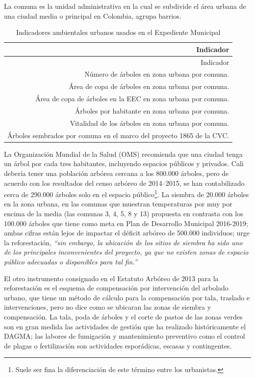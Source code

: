 \documentclass[12pt,]{book}
\let\rmarkdownfootnote\footnote%
\def\footnote{\protect\rmarkdownfootnote}
\begin{document}
La comuna es la unidad administrativa en la cual se subdivide el área
urbana de una ciudad media o principal en Colombia, agrupa barrios.

\begin{longtable}[]{@{}r@{}}
\caption{\label{tab:indic-ExMu} Indicadores ambientales urbanos usados en el
Expediente Municipal}\tabularnewline
\toprule
Indicador\tabularnewline
\midrule
\endfirsthead
\toprule
Indicador\tabularnewline
\midrule
\endhead
Número de árboles en zona urbana por comuna.\tabularnewline
Área de copa de árboles en zona urbana por comuna.\tabularnewline
Área de copa de árboles en la EEC en zona urbana por
comuna.\tabularnewline
Árboles por habitante en zona urbana por comuna.\tabularnewline
Vitalidad de los árboles en zona urbana por comuna.\tabularnewline
Árboles sembrados por comuna en el marco del proyecto 1865 de la
CVC.\tabularnewline
\bottomrule
\end{longtable}

La Organización Mundial de la Salud (OMS) recomienda que una ciudad
tenga un árbol por cada tres habitantes, incluyendo espacios públicos y
privados. Cali debería tener una población arbórea cercana a los 800.000
árboles, pero de acuerdo con los resultados del censo arbóreo de
2014--2015, se han contabilizado cerca de 290.000 árboles solo en el
espacio público\footnote{Suele ser fina la diferenciación de este
  término entre los urbanistas.}. La siembra de 20.000 árboles en la
zona urbana, en las comunas que muestran temperaturas por muy por encima
de la media (las comunas 3, 4, 5, 8 y 13) propuesta en
\citep{ciat_identificacion_2015} contrasta con los 100.000 árboles que
tiene como meta en Plan de Desarrollo Municipal 2016-2019; ambas cifras
están lejos de impactar el déficit arbóreo de 500.000 individuos; urge
la reforestación, \emph{``sin embargo, la ubicación de los sitios de
siembra ha sido uno de los principales inconvenientes del proyecto, ya
que no existen zonas de espacio público adecuadas o disponibles para tal
fin.''} \citep[p.~19]{ciat_identificacion_2015}

El otro instrumento consignado en el Estatuto Arbóreo de 2013
\citep{noauthor_estatuo_2013} para la reforestación es el esquema de
compensación por intervención del arbolado urbano, que tiene un método
de cálculo para la compensación por tala, traslado e intervenciones,
pero no dice como se ubicaran las zonas de siembra y compensación. La
tala, poda de árboles y el corte de pastos de las zonas verdes son en
gran medida las actividades de gestión que ha realizado históricamente
el DAGMA; las labores de fumigación y mantenimiento preventivo como el
control de plagas o fertilización son actividades esporádicas, escasas y
contingentes.
\end{document}
